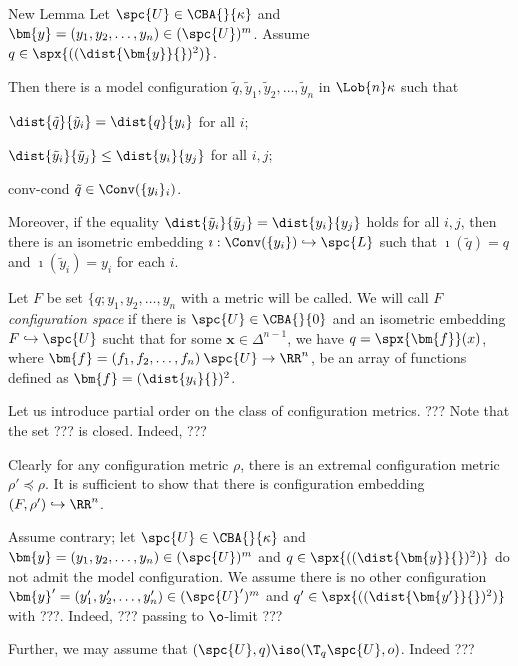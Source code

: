{\begin{thm}{New Lemma}\label{lem:neg-config}
Let $\spc{U}\in \CBA{}{\kappa}$ 
and $\bm{y}=(y_1,y_2,\dots, y_n)\in (\spc{U})^m$.
Assume $q\in \spx{((\dist{\bm{y}}{})^2)}$.

Then there is a model configuration
$\tilde q,\tilde y_1,\tilde y_2,\dots, \tilde y_n$ in $\Lob{n}\kappa$ such that 
\begin{subthm}{}
$\dist{\tilde q}{\tilde y_i}= \dist{q}{y_i}$ for all $i$; 
\end{subthm}


\begin{subthm}{}$\dist{\tilde y_i}{\tilde y_j}\le\dist{y_i}{y_j}$ for all $i,j$;
\end{subthm}

\begin{subthm}{conv-cond} $\tilde q\in \Conv(\{y_i\}_{i})$.
\end{subthm}

Moreover, if the equality $\dist{\tilde y_i}{\tilde y_j}=\dist{y_i}{y_j}$ holds for all $i,j$, 
then there is an isometric embedding $\imath:\Conv(\{y_i\})\hookrightarrow \spc{L}$ such that $\imath(\tilde q)=q$ and $\imath(\tilde y_i)=y_i$ for each $i$.
\end{thm}


Let $F$ be set $\{q;y_1,y_2,\dots,y_n$ with a metric 
will be called.
We will call $F$ \emph{configuration space} if there is $\spc{U}\in\CBA{}{0}$
and an isometric embedding $F\hookrightarrow\spc{U}$ sucht that for some $\bm{x}\in\Delta^{n-1}$, we have $q=\spx{\bm{f}}(x)$, where $\bm{f}=(f_1,f_2,\dots,f_n)\:\spc{U}\to\RR^n$, be an array of functions defined as $\bm{f}=(\dist{y_i}{})^2$.

Let us introduce partial order on the class of configuration metrics.
???
Note that the set ??? is closed.
Indeed, ???

Clearly for any configuration metric $\rho$,
there is an extremal configuration metric $\rho'\preccurlyeq\rho$.
It is sufficient to show that there is configuration embedding $(F,\rho')\hookrightarrow\RR^n$.

Assume contrary; let $\spc{U}\in \CBA{}{\kappa}$ 
and $\bm{y}=(y_1,y_2,\dots, y_n)\in (\spc{U})^m$ and $q\in \spx{((\dist{\bm{y}}{})^2)}$ do not admit the model configuration.
We assume there is no other configuration $\bm{y}'=(y_1',y_2',\dots, y_n')\in (\spc{U}')^m$ and $q'\in \spx{((\dist{\bm{y'}}{})^2)}$ with ???.
Indeed, ??? passing to $\o$-limit ???

Further, we may assume that $(\spc{U},q)\iso(\T_q\spc{U},o)$.
Indeed ???

}
